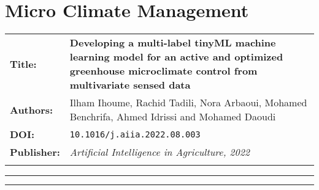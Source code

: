 \documentclass[../main]{subfiles}
\begin{document}
\chapter{Micro Climate Management} \label{chp:}

\begin{center}

    \begin{tabularx} {\textwidth} {
            >{\bfseries}m{2.0cm}X
        }

        Title: & \textbf{Developing a multi-label tinyML machine learning model for an active and optimized greenhouse microclimate control from multivariate sensed data}
        \\

        Authors: & Ilham Ihoume, Rachid Tadili, Nora Arbaoui, Mohamed Benchrifa, Ahmed Idrissi and Mohamed Daoudi
        \\

        DOI: & \texttt{10.1016/j.aiia.2022.08.003}

        \\

        Publisher: & \textit{Artificial Intelligence in Agriculture, 2022} \vfill
        \\

        \\


    \end{tabularx}

\end{center}

\begin{center}
    \vspace{-0.75cm}
    \rule{\textwidth}{0.75pt}
\end{center}



\begin{center}
    \vspace{-0.25cm}
    \rule{\textwidth}{0.75pt}
\end{center}





\end{document}
